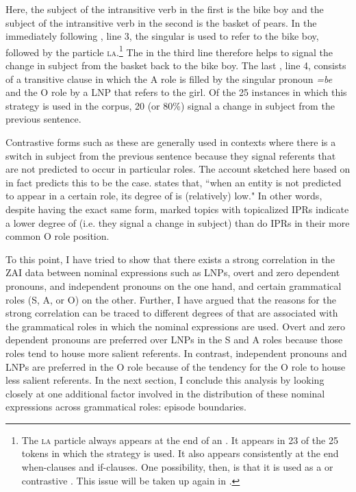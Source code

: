 \largerpage

Here, the subject of the intransitive verb in the first  is the bike boy and the subject of the intransitive verb in the second  is the basket of pears. In the immediately following , line 3, the  singular  is used to refer to the bike boy, followed by the particle \textsc{la}.\footnote{The \textsc{la} particle always appears at the end of an . It appears in 23 of the 25 tokens in which the  strategy is used. It also appears consistently at the end when-clauses and if-clauses. One possibility, then, is that it is used as a  or contrastive . This issue will be taken up again in .} The  in the third line therefore helps to signal the change in subject from the basket back to the bike boy. The last , line 4, consists of a transitive clause in which the A role is filled by the  singular pronoun \textit{=be} and the O role by a LNP that refers to the girl. Of the 25 instances in which this strategy is used in the corpus, 20 (or 80{\%}) signal a change in subject from the previous sentence. 


Contrastive forms such as these are generally used in contexts where there is a switch in subject from the previous sentence because they signal referents that are not predicted to occur in particular roles. The account sketched here based on  in fact predicts this to be the case. \citet[37]{ariel2001} states that, ``when an entity is not predicted to appear in a certain role, its degree of  is (relatively) low." In other words, despite having the exact same form, marked topics with topicalized IPRs indicate a lower degree of  (i.e. they signal a change in subject) than do IPRs in their more common O role position. 

To this point, I have tried to show that there exists a strong correlation in the ZAI data between nominal expressions such as LNPs, overt and zero dependent pronouns, and independent pronouns on the one hand, and certain grammatical roles (S, A, or O) on the other. Further, I have argued that the reasons for the strong correlation can be traced to different degrees of  that are associated with the grammatical roles in which the nominal expressions are used. Overt and zero dependent pronouns are preferred over LNPs in the S and A roles because those roles tend to house more salient referents. In contrast, independent pronouns and LNPs are preferred in the O role because of the tendency for the O role to house less salient referents. In the next section, I conclude this analysis by looking closely at one additional factor involved in the distribution of these nominal expressions across grammatical roles: episode boundaries.


